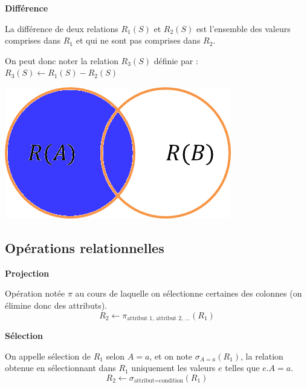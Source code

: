 \documentclass[10pt]{article}
\begin{document}
\begin{defi}
\begin{minipage}[c]{.75\linewidth}
\textbf{Différence}

La différence de deux relations $R_1(S)$ et $R_2(S)$ est l'ensemble des valeurs comprises dans $R_1$ et qui ne sont pas comprises dans $R_2$. 

On peut donc noter la relation $R_3(S)$ définie par : $R_3(S)\leftarrow R_1(S)-R_2(S)$
\end{minipage}\hfill
\begin{minipage}[c]{.2\linewidth}
\begin{center}
\includegraphics[width=.95\textwidth]{images/diff}
\end{center}
\end{minipage}
\end{defi}


\subsection{Opérations relationnelles}

\begin{defi}

\textbf{Projection}

Opération notée $\pi$ au cours de laquelle on sélectionne certaines des colonnes (on élimine donc des attributs). 
 $$
 R_2 \leftarrow \pi_{\text{attribut 1, attribut 2, ...}}(R_1)
 $$

\end{defi}


\begin{defi}
\textbf{Sélection}

On appelle sélection de $R_1$ selon $A=a$, et on note $\sigma_{A=a}(R_1)$, la relation obtenue en sélectionnant dans $R_1$ uniquement les valeurs $e$ telles que $e.A = a$.
$$
R_2 \leftarrow \sigma_{\text{attribut}=\text{condition}}(R_1)
$$
\end{defi}
\end{document}
